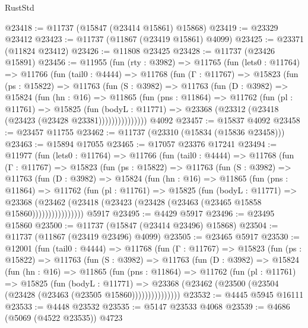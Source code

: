 \begin{lexlean}{RustStd}
\begin{coremodule}
@23418 := @11737 (@15847 (@23414 @15861) @15868)
@23419 := @23329 @23412
@23423 := @11737 (@11867 (@23419 @15861) @4099)
@23425 := @23371 (@11824 @23412)
@23426 := @11808 @23425
@23428 := @11737 (@23426 @15891)
@23456 := @11955
    (fun (rty : @3982) =>
    @11765
      (fun (lets0 : @11764) =>
      @11766
        (fun (tail0 : @4444) =>
        @11768
          (fun (Γ : @11767) =>
          @15823
            (fun (ps : @15822) =>
            @11763
              (fun (S : @3982) =>
              @11763
                (fun (D : @3982) =>
                @15824
                  (fun (hn : @16) =>
                  @11865
                    (fun (pns : @11864) =>
                    @11762
                      (fun (pl : @11761) =>
                      @15825
                        (fun (bodyL : @11771) =>
                        @23368 (@23312 (@23418 (@23423 (@23428 @23381)))))))))))))))
    @4092
@23457 := @15837 @4092
@23458 := @23457 @11755
@23462 := @11737 (@23310 (@15834 (@15836 @23458)))
@23463 := @15894 @17055
@23465 := @17057 @23376 @17241
@23494 := @11977
    (fun (lets0 : @11764) =>
    @11766
      (fun (tail0 : @4444) =>
      @11768
        (fun (Γ : @11767) =>
        @15823
          (fun (ps : @15822) =>
          @11763
            (fun (S : @3982) =>
            @11763
              (fun (D : @3982) =>
              @15824
                (fun (hn : @16) =>
                @11865
                  (fun (pns : @11864) =>
                  @11762
                    (fun (pl : @11761) =>
                    @15825
                      (fun (bodyL : @11771) =>
                      @23368
                        (@23462
                          (@23418 (@23423 (@23428 (@23463 (@23465 @15858 @15860))))))))))))))))
    @5917
@23495 := @4429 @5917
@23496 := @23495 @15860
@23500 := @11737 (@15847 (@23414 @23496) @15868)
@23504 := @11737 (@11867 (@23419 @23496) @4099)
@23505 := @23465 @5917
@23530 := @12001
    (fun (tail0 : @4444) =>
    @11768
      (fun (Γ : @11767) =>
      @15823
        (fun (ps : @15822) =>
        @11763
          (fun (S : @3982) =>
          @11763
            (fun (D : @3982) =>
            @15824
              (fun (hn : @16) =>
              @11865
                (fun (pns : @11864) =>
                @11762
                  (fun (pl : @11761) =>
                  @15825
                    (fun (bodyL : @11771) =>
                    @23368 (@23462 (@23500 (@23504 (@23428 (@23463 (@23505 @15860)))))))))))))))
@23532 := @4445 @5945 @16111
@23533 := @4448 @23532
@23535 := @5147 @23533 @4068
@23539 := @4686 (@5069 (@4522 @23535)) @4723

\end{coremodule}
\end{lexlean}
